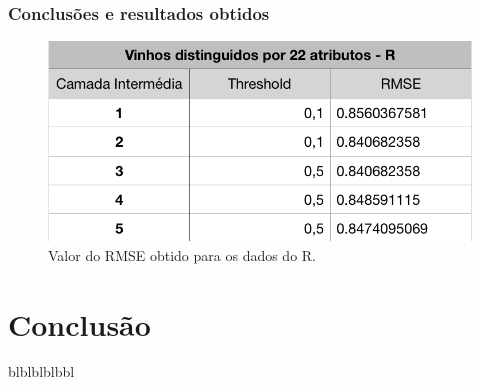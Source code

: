 \documentclass{report}
\begin{document}
\subsection{Conclusões e resultados obtidos}


\begin{figure}[h!]
\centering
\includegraphics[scale=0.5]{tabelas/7} 
\caption{Valor do RMSE obtido para os dados do R.}
\end{figure} 






\chapter{Conclusão} \label{concl}

blblblblbbl
 


 
 
 
\end{document}
